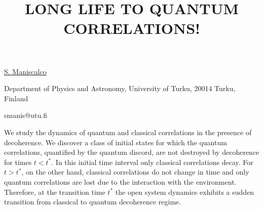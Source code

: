 \title{LONG LIFE TO QUANTUM CORRELATIONS!}

\underline{S. Maniscalco} 

{\normalsize{\vspace{-4mm}
Department of Physics and Astronomy, University of Turku, 20014
Turku, Finland

\email smanis@utu.fi}}

We study the dynamics of quantum and classical correlations in the
presence of decoherence. We discover a class of initial states for
which the quantum correlations, quantified by the quantum discord,
are not destroyed by decoherence for times $t<t^*$. In this
initial time interval only classical correlations decay. For $t>t^*$,
on the other hand, classical correlations do not change in
time and only quantum correlations are lost due to the interaction
with the environment. Therefore, at the transition time $t^*$
the open system dynamics exhibits a sudden transition from classical to
quantum decoherence regime.

\vspace{\baselineskip} 